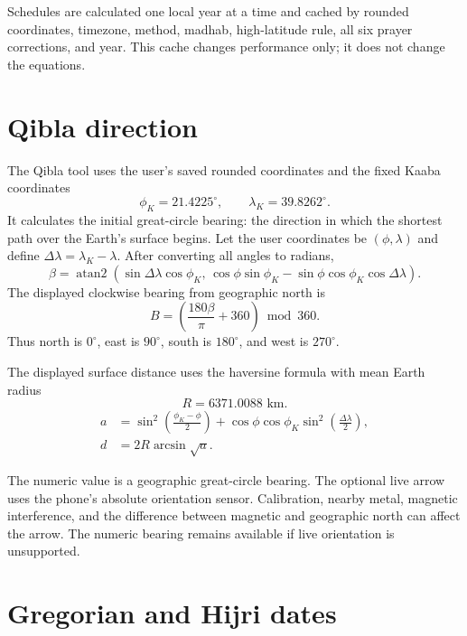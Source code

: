 \documentclass[11pt,a4paper]{article}
\newcommand{\note}[1]{%
  \begin{center}\colorbox{soft}{\parbox{0.92\linewidth}{\small #1}}\end{center}}
\begin{document}
Schedules are calculated one local year at a time and cached by rounded coordinates, timezone, method, madhab, high-latitude rule, all six prayer corrections, and year. This cache changes performance only; it does not change the equations.

\section{Qibla direction}\label{sec:qibla}

The Qibla tool uses the user's saved rounded coordinates and the fixed Kaaba coordinates
\[
  \phi_K=21.4225^\circ,\qquad \lambda_K=39.8262^\circ.
\]
It calculates the initial great-circle bearing: the direction in which the shortest path over the Earth's surface begins. Let the user coordinates be $(\phi,\lambda)$ and define $\Delta\lambda=\lambda_K-\lambda$. After converting all angles to radians,
\begin{equation}
  \beta=\operatorname{atan2}\!\left(
    \sin\Delta\lambda\cos\phi_K,\,
    \cos\phi\sin\phi_K-\sin\phi\cos\phi_K\cos\Delta\lambda
  \right).
  \label{eq:qibla-bearing}
\end{equation}
The displayed clockwise bearing from geographic north is
\begin{equation}
  B=\left(\frac{180\beta}{\pi}+360\right)\bmod 360.
\end{equation}
Thus north is $0^\circ$, east is $90^\circ$, south is $180^\circ$, and west is $270^\circ$.

The displayed surface distance uses the haversine formula with mean Earth radius
\[
  R=6371.0088\text{ km}.
\]
\begin{align}
  a &= \sin^2\!\left(\frac{\phi_K-\phi}{2}\right)
  +\cos\phi\cos\phi_K\sin^2\!\left(\frac{\Delta\lambda}{2}\right),\\
  d &= 2R\arcsin\sqrt{a}.
  \label{eq:qibla-distance}
\end{align}

\note{The numeric value is a geographic great-circle bearing. The optional live arrow uses the phone's absolute orientation sensor. Calibration, nearby metal, magnetic interference, and the difference between magnetic and geographic north can affect the arrow. The numeric bearing remains available if live orientation is unsupported.}

\section{Gregorian and Hijri dates}
\end{document}
